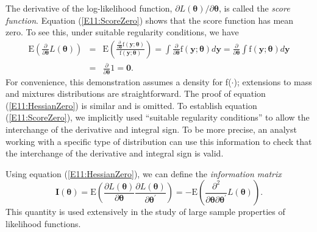 
The derivative of the log-likelihood function, $\partial
L(\boldsymbol \theta)/\partial \boldsymbol \theta$, is called the
\emph{score function}. Equation (\ref{E11:ScoreZero}) shows that the
score function has mean zero. To see this, under suitable regularity
conditions, we have
\begin{eqnarray*}
\mathrm{E} \left( \frac{ \partial}{\partial \boldsymbol \theta}
L(\boldsymbol \theta) \right) &=& \mathrm{E} \left( \frac{
\frac{\partial}{\partial \boldsymbol \theta}
\mathrm{f}(\mathbf{y};\boldsymbol \theta
)}{\mathrm{f}(\mathbf{y};\boldsymbol \theta )}  \right) = \int
\frac{\partial}{\partial \boldsymbol \theta}
\mathrm{f}(\mathbf{y};\boldsymbol \theta ) d \mathbf y =
\frac{\partial}{\partial \boldsymbol \theta} \int
\mathrm{f}(\mathbf{y};\boldsymbol \theta ) d \mathbf y \\
&=& \frac{\partial}{\partial \boldsymbol \theta} 1 = \mathbf 0.
\end{eqnarray*}
For convenience, this demonstration assumes a density for f($\cdot$);
extensions to mass and mixtures distributions are straightforward.
The proof of equation (\ref{E11:HessianZero}) is similar and is
omitted. To establish equation (\ref{E11:ScoreZero}), we implicitly
used ``suitable regularity conditions'' to allow the interchange of
the derivative and integral sign. To be more precise, an analyst
working with a specific type of distribution can use this
information to check that the interchange of the derivative and
integral sign is valid.

Using equation (\ref{E11:HessianZero}), we can define the
\emph{information matrix}
\begin{equation}\label{E11:InfoMatrix}
\mathbf{I}(\boldsymbol \theta) = \mathrm{E} \left( \frac{ \partial
L(\boldsymbol \theta)}{\partial \boldsymbol \theta} \frac{ \partial
L(\boldsymbol \theta)}{\partial \boldsymbol \theta^{\prime}}
 \right) = -\mathrm{E} \left( \frac{ \partial^2}{\partial \boldsymbol \theta
\partial \boldsymbol \theta^{\prime}} L(\boldsymbol \theta) \right).
\end{equation}
This quantity is used extensively in the study of large sample
properties of likelihood functions.


